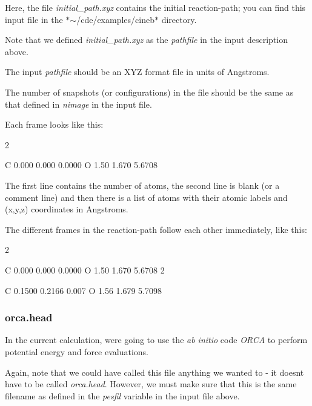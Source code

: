 Here, the file {\itshape initial\+\_\+path.\+xyz} contains the initial reaction-\/path; you can find this input file in the $\ast$$\sim$/cde/examples/cineb$\ast$ directory.

Note that we defined {\itshape initial\+\_\+path.\+xyz} as the {\itshape pathfile} in the input description above.


\begin{DoxyItemize}
\item The input {\itshape pathfile} should be an X\+YZ format file in units of Angstroms.
\item The number of snapshots (or configurations) in the file should be the same as that defined in {\itshape nimage} in the input file.
\item Each frame looks like this\+: \begin{DoxyVerb}  2

  C 0.000  0.000 0.0000
  O 1.50   1.670 5.6708
\end{DoxyVerb}

\item The first line contains the number of atoms, the second line is blank (or a comment line) and then there is a list of atoms with their atomic labels and (x,y,z) coordinates in Angstroms.
\item The different frames in the reaction-\/path follow each other immediately, like this\+: \begin{DoxyVerb}  2

  C 0.000  0.000 0.0000
  O 1.50   1.670 5.6708
  2

  C 0.1500  0.2166 0.007
  O 1.56  1.679  5.7098
\end{DoxyVerb}

\end{DoxyItemize}

\subsubsection*{orca.\+head}

In the current calculation, we\textquotesingle{}re going to use the {\itshape ab initio} code {\itshape O\+R\+CA} to perform potential energy and force evaluations.

Again, note that we could have called this file anything we wanted to -\/ it doesn\textquotesingle{}t have to be called {\itshape orca.\+head}. However, we must make sure that this is the same filename as defined in the {\itshape pesfil} variable in the input file above.


